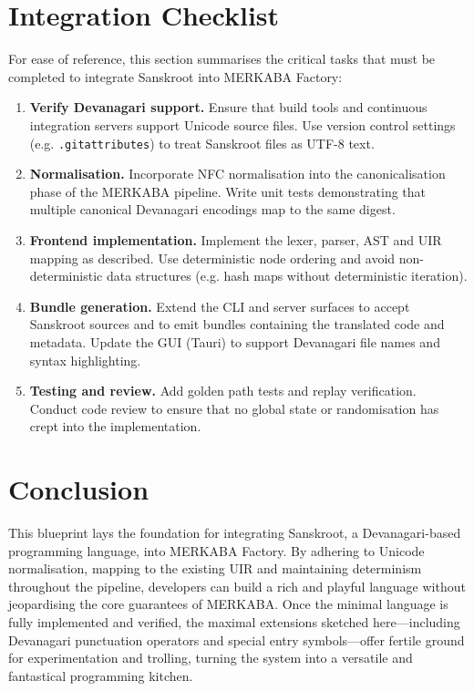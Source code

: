 \documentclass[12pt]{article}
\begin{document}
\section{Integration Checklist}

For ease of reference, this section summarises the critical tasks that must
be completed to integrate Sanskroot into MERKABA Factory:

\begin{enumerate}
  \item \textbf{Verify Devanagari support.} Ensure that build tools and
    continuous integration servers support Unicode source files.  Use
    version control settings (e.g. \texttt{.gitattributes}) to treat
    Sanskroot files as UTF-8 text.
  \item \textbf{Normalisation.} Incorporate NFC normalisation into the
    canonicalisation phase of the MERKABA pipeline.  Write unit tests
    demonstrating that multiple canonical Devanagari encodings map to the
    same digest.
  \item \textbf{Frontend implementation.} Implement the lexer, parser,
    AST and UIR mapping as described.  Use deterministic node ordering
    and avoid non-deterministic data structures (e.g. hash maps without
    deterministic iteration).
  \item \textbf{Bundle generation.} Extend the CLI and server surfaces
    to accept Sanskroot sources and to emit bundles containing the
    translated code and metadata.  Update the GUI (Tauri) to support
    Devanagari file names and syntax highlighting.
  \item \textbf{Testing and review.} Add golden path tests and replay
    verification.  Conduct code review to ensure that no global state or
    randomisation has crept into the implementation.
\end{enumerate}

\section{Conclusion}

This blueprint lays the foundation for integrating Sanskroot, a
Devanagari-based programming language, into MERKABA Factory.  By adhering
to Unicode normalisation, mapping to the existing UIR and maintaining
determinism throughout the pipeline, developers can build a rich and
playful language without jeopardising the core guarantees of MERKABA.
Once the minimal language is fully implemented and verified, the maximal
extensions sketched here—including Devanagari punctuation operators and
special entry symbols—offer fertile ground for experimentation and
trolling, turning the system into a versatile and fantastical programming
kitchen.
\end{document}

